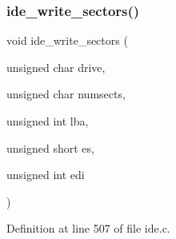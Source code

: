 \subsubsection{\texorpdfstring{ide\+\_\+write\+\_\+sectors()}{ide\_write\_sectors()}}
{\footnotesize\ttfamily void ide\+\_\+write\+\_\+sectors (\begin{DoxyParamCaption}\item[{unsigned char}]{drive,  }\item[{unsigned char}]{numsects,  }\item[{unsigned int}]{lba,  }\item[{unsigned short}]{es,  }\item[{unsigned int}]{edi }\end{DoxyParamCaption})}



Definition at line 507 of file ide.\+c.


